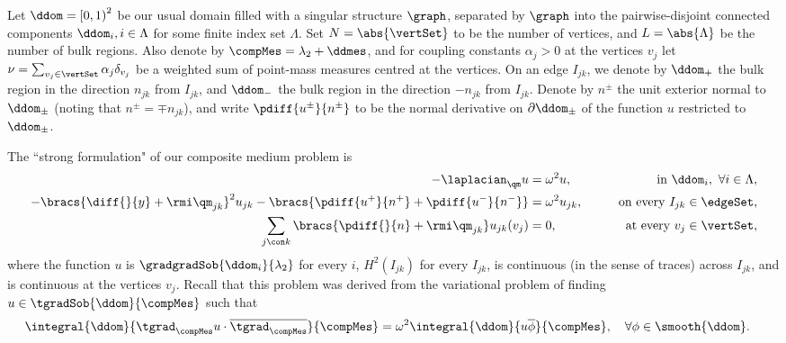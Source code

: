\documentclass[11pt]{report}
\begin{document}
Let $\ddom=\left[0,1\right)^2$ be our usual domain filled with a singular structure $\graph$, separated by $\graph$ into the pairwise-disjoint connected components $\ddom_i, i\in\Lambda$ for some finite index set $\Lambda$.
Set $N = \abs{\vertSet}$ to be the number of vertices, and $L=\abs{\Lambda}$ be the number of bulk regions.
Also denote by $\compMes = \lambda_2 + \ddmes$, and for coupling constants $\alpha_j>0$ at the vertices $v_j$ let $\nu = \sum_{v_j\in\vertSet}\alpha_j\delta_{v_j}$ be a weighted sum of point-mass measures centred at the vertices.
On an edge $I_{jk}$, we denote by $\ddom_+$ the bulk region in the direction $n_{jk}$ from $I_{jk}$, and $\ddom_-$ the bulk region in the direction $-n_{jk}$ from $I_{jk}$.
Denote by $n^{\pm}$ the unit exterior normal to $\ddom_{\pm}$ (noting that $n^{\pm}=\mp n_{jk}$), and write $\pdiff{u^{\pm}}{n^{\pm}}$ to be the normal derivative on $\partial\ddom_{\pm}$ of the function $u$ restricted to $\ddom_{\pm}$.

The ``strong formulation" of our composite medium problem is
\begin{subequations} \label{eq:StrongForm}
	\begin{align}
		-\laplacian_{\qm}u &= \omega^2 u, &\qquad\text{in } \ddom_i, \ \forall i\in\Lambda, \\
		-\bracs{\diff{}{y}+\rmi\qm_{jk}}^2 u_{jk} - \bracs{\pdiff{u^+}{n^+} + \pdiff{u^-}{n^-}} &= \omega^2 u_{jk},  &\qquad\text{on every } I_{jk}\in\edgeSet, \\
		\sum_{j\con k}\bracs{\pdiff{}{n}+\rmi\qm_{jk}}u_{jk}(v_j) &= 0, &\qquad\text{at every } v_j\in\vertSet,
	\end{align}
\end{subequations}
where the function $u$ is $\gradgradSob{\ddom_i}{\lambda_2}$ for every $i$, $H^2(I_{jk})$ for every $I_{jk}$, is continuous (in the sense of traces) across $I_{jk}$, and is continuous at the vertices $v_j$.
Recall that this problem was derived from the variational problem of finding $u\in\tgradSob{\ddom}{\compMes}$ such that
\begin{align} \label{eq:WeakForm}
	\integral{\ddom}{ \tgrad_{\compMes}u\cdot\overline{\tgrad_{\compMes}} }{\compMes} &=
	\omega^2\integral{\ddom}{ u\overline{\phi} }{\compMes}, \quad\forall\phi\in\smooth{\ddom}.
\end{align}
\end{document}
